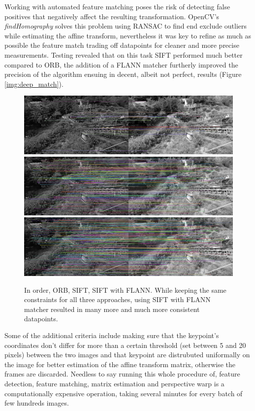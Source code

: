Working with automated feature matching poses the risk of detecting false positives that negatively affect the resulting transformation. OpenCV's \emph{findHomography} solves this problem using RANSAC to find end exclude outliers while estimating the affine transform, nevertheless it was key to refine as much as possible the feature match trading off datapoints for cleaner and more precise measurements.
Testing revealed that on this task SIFT performed much better compared to ORB, the addition of a FLANN matcher furtherly improved the precision of the algorithm ensuing in decent, albeit not perfect, results (Figure \ref{img:deep_match}).

\begin{figure}[H]
  \centering
  \includegraphics[scale=0.2]{figures/ORB.png}
  \includegraphics[scale=0.2]{figures/SIFT.png}
  \includegraphics[scale=0.2]{figures/FLANN.png}
  \caption{In order, ORB, SIFT, SIFT with FLANN. While keeping the same constraints for all three approaches, using SIFT with FLANN matcher resulted in many more and much more consistent datapoints.}
  \label{img:orb_sift}
\end{figure}

Some of the additional criteria include making sure that the keypoint's coordinates don't differ for more than a certain threshold (set between 5 and 20 pixels) between the two images and that keypoint are distrubuted uniformally on the image for better estimation of the affine transform matrix, otherwise the frames are discarded. Needless to say running this whole procedure of, feature detection, feature matching, matrix estimation and perspective warp is a computationally expensive operation, taking several minutes for every batch of few hundreds images.

